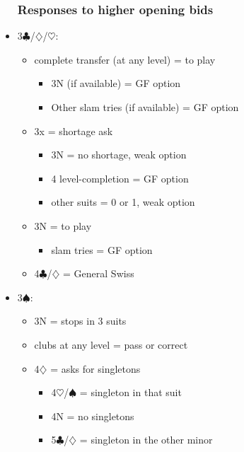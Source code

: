 \documentclass[a4paper,14pt]{extarticle}
\begin{document}
\begin{itemize}
\newpage

\subsubsection{Responses to higher opening bids}
\label{sec:resp:higher}

\item 3$\clubsuit$/$\diamondsuit$/$\heartsuit$:
	\begin{itemize}
	\item complete transfer (at any level) = to play
		\begin{itemize}
		\item 3N (if available) = GF option
		\item Other slam tries (if available) = GF option
		\end{itemize}
	\item 3x = shortage ask
		\begin{itemize}
		\item 3N = no shortage, weak option
		\item 4 level-completion = GF option
		\item other suits = 0 or 1, weak option
		\end{itemize}
	\item 3N = to play
		\begin{itemize}
		\item slam tries = GF option
		\end{itemize}
	\item 4$\clubsuit$/$\diamondsuit$ = General Swiss~
	\end{itemize}

\item 3$\spadesuit$:
	\begin{itemize}
	\item 3N = stops in 3 suits
	\item clubs at any level = pass or correct
	\item 4$\diamondsuit$ = asks for singletons
		\begin{itemize}
		\item 4$\heartsuit$/$\spadesuit$ = singleton in that suit
		\item 4N = no singletons
		\item 5$\clubsuit$/$\diamondsuit$ = singleton in the other minor
		\end{itemize}
	\end{itemize}


\end{itemize}
\end{document}
